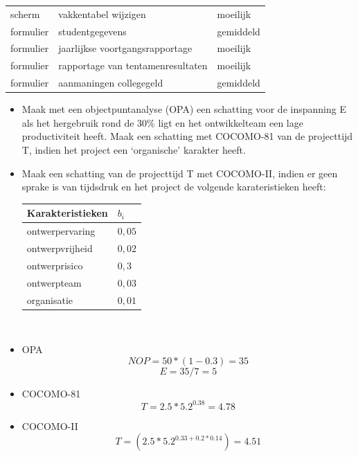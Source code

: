 \documentclass[a4paper,titlepage]{artikel1}
\begin{document}
{\begin{tabular}[t]{|ll|l|}
     scherm & vakkentabel wijzigen & moeilijk \\
     formulier & studentgegevens & gemiddeld \\
     formulier & jaarlijkse voortgangsrapportage & moeilijk \\
     formulier & rapportage van tentamenresultaten & moeilijk \\
     formulier & aanmaningen collegegeld & gemiddeld \\
     \hline
   \end{tabular}
   \begin{itemize}
     \item Maak met een objectpuntanalyse (OPA) een schatting voor de inspanning E als het hergebruik rond de $30\%$ ligt en het ontwikkelteam een lage productiviteit heeft. Maak een schatting met COCOMO-81 van de projecttijd T, indien het project een `organische' karakter heeft.
     \item Maak een schatting van de projecttijd T met COCOMO-II, indien er geen sprake is van tijdsdruk en het project de volgende karateristieken heeft:\\
       \begin{tabular}[]{|l|l|}
         \hline
         Karakteristieken & $b_i$ \\
         \hline
         ontwerpervaring & $0,05$ \\
         ontwerpvrijheid & $0,02$ \\
         ontwerprisico & $0,3$ \\
         ontwerpteam & $0,03$ \\
         organisatie & $0,01$ \\
         \hline
       \end{tabular}\\
   \end{itemize}
   }
   \begin{itemize}
    \item OPA
	  \begin{displaymath}
	   NOP=50*(1-0.3)=35
	  \end{displaymath} 
	  \begin{displaymath}
	   E=35/7=5
	  \end{displaymath}
    \item COCOMO-81
	  \begin{displaymath}
	   T=2.5*5.2^{0.38}=4.78
	  \end{displaymath}
    \item COCOMO-II
	  \begin{displaymath}
	   T=(2.5*5.2^{0.33+0.2*0.14})=4.51
	  \end{displaymath}
   \end{itemize}
\end{document}
